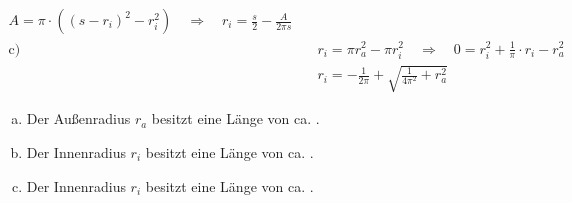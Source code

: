 \begin{exercise}
\begin{minipage}{\dimen2}
\begin{equation*}
\begin{split}
            A=\pi\cdot\left((s-r_i)^2-r_i^2\right)
            \quad\Rightarrow\quad
            r_i=\frac{s}{2}-\frac{A}{2\pi s}
            \\[2ex]
            \text{c)}&\quad
            r_i=\pi r_a^2-\pi r_i^2
            \quad\Rightarrow\quad
            0=r_i^2+\frac{1}{\pi}\cdot r_i-r_a^2
            \\
            \text{~}&\quad
            r_i=-\frac{1}{2\pi}+\sqrt{\frac{1}{4\pi^2}+r_a^2}
          \end{split}
        \end{equation*}
      \end{minipage}%
    \endgroup
  \fi
  \ifoutcome\outcome\par
    \begin{enumerate}[a)]
      \item Der Außenradius $r_a$ besitzt eine Länge von ca. .
      \item Der Innenradius $r_i$ besitzt eine Länge von ca. .
      \item Der Innenradius $r_i$ besitzt eine Länge von ca. .
    \end{enumerate}
  \fi
\end{exercise}
